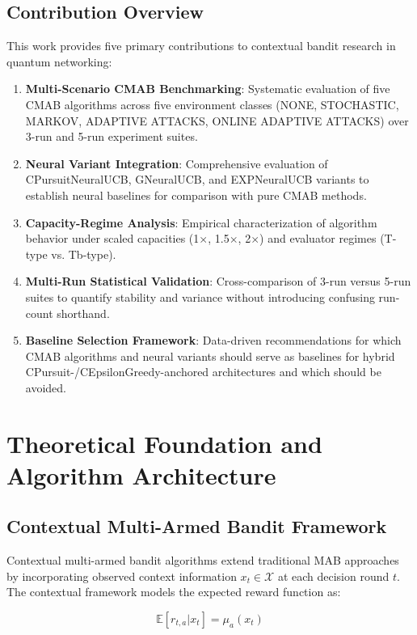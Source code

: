 \documentclass[12pt,a4paper]{article}
\begin{document}
\subsection{Contribution Overview}

This work provides five primary contributions to contextual bandit research in quantum networking:

\begin{enumerate}
\item \textbf{Multi-Scenario CMAB Benchmarking}: Systematic evaluation of five CMAB algorithms across five environment classes (NONE, STOCHASTIC, MARKOV, ADAPTIVE ATTACKS, ONLINE ADAPTIVE ATTACKS) over 3-run and 5-run experiment suites.
\item \textbf{Neural Variant Integration}: Comprehensive evaluation of CPursuitNeuralUCB, GNeuralUCB, and EXPNeuralUCB variants to establish neural baselines for comparison with pure CMAB methods.
\item \textbf{Capacity-Regime Analysis}: Empirical characterization of algorithm behavior under scaled capacities (1$\times$, 1.5$\times$, 2$\times$) and evaluator regimes (T-type vs. Tb-type).
\item \textbf{Multi-Run Statistical Validation}: Cross-comparison of 3-run versus 5-run suites to quantify stability and variance without introducing confusing run-count shorthand.
\item \textbf{Baseline Selection Framework}: Data-driven recommendations for which CMAB algorithms and neural variants should serve as baselines for hybrid CPursuit-/CEpsilonGreedy-anchored architectures and which should be avoided.
\end{enumerate}

\newpage
\section{Theoretical Foundation and Algorithm Architecture}

\subsection{Contextual Multi-Armed Bandit Framework}

Contextual multi-armed bandit algorithms extend traditional MAB approaches by incorporating observed context information $x_t \in \mathcal{X}$ at each decision round $t$. The contextual framework models the expected reward function as:

\begin{equation}
\mathbb{E}[r_{t,a} | x_t] = \mu_a(x_t)
\end{equation}
\end{document}
